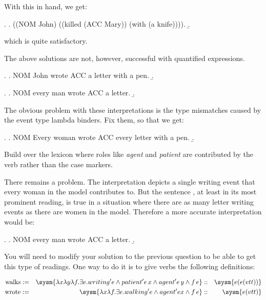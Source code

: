 \documentclass[10pt,a4paper]{exam}
\begin{document}
With this in hand, we get:

\ex.
\a. ((NOM John) ((killed (ACC Mary)) (with (a knife)))).
\b. 

which is quite satisfactory.

\begin{questions}
\question[30] The above solutions are not, however, successful with quantified expressions.

\ex.
\a. NOM John wrote ACC a letter with a pen.
\b. 


\ex.
\a. NOM every man wrote ACC a letter.
\b. 


The obvious problem with these interpretations is the type mismatches caused by the event type lambda binders. Fix them, so that we get:


\ex.\label{probex}
\a.\label{probexEx} NOM Every woman wrote ACC every letter with a pen.
\b.\label{probexInt}


Build over the lexicon where roles like \emph{agent} and \emph{patient} are contributed by the verb rather than the case markers.


\question[50] There remains a problem. The interpretation
 depicts a single writing event that every woman in
the model contributes to. But the sentence , at least
in its most prominent reading, is true in a situation where there are
as many letter writing events as there are women in the model.
Therefore a more accurate interpretation would be:


\ex.
\a. NOM every man wrote ACC a letter.
\b. 


You will need to modify  your solution to the previous question to be able to get this type of readings. One way to do it is to give verbs the following definitions:

\[
\begin{align*}
	\text{walks}   &:=& \sysm{\lambda x\lambda y\lambda f.\exists e . writing' e \land patient' e\, x \land agent' e\, y \land f\, e }  &::& \sysm{e(e(vtt))}\\
	\text{wrote}   &:=& \sysm{\lambda x\lambda f . \exists e . walking' e \land agent' e x \land f\, e }  &::& \sysm{e(vtt)}
\end{align*}
\]


\end{questions}
\end{document}
